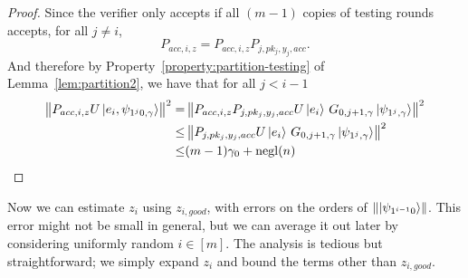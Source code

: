 \begin{proof}
	Since the verifier only accepts if all $(m-1)$ copies of testing rounds accepts, for all $j\neq i$,
	$$P_{acc,i,z}=P_{acc,i,z}P_{j,pk_j,y_j,acc}.$$
	And therefore by Property~\ref{property:partition-testing} of Lemma~\ref{lem:partition2}, we have that for all $j <i-1$
	\begin{align} \label{eq:rejected-d}
		\left\lVert P_{acc,i,z} U \ket{e_i, \psi_{1^j0,\gamma}}\right\rVert^2
		=& \left\lVert P_{acc,i,z}P_{j,pk_j,y_j,acc} U \ket{e_i}\, G_{0,j+1,\gamma}\ket{\psi_{1^j,\gamma}}  \right\rVert^2 \nonumber \\
		\leq& \left\lVert P_{j,pk_j,y_j,acc} U \ket{e_i}\, G_{0,j+1,\gamma}\ket{\psi_{1^j,\gamma}}  \right\rVert^2 \nonumber \\
		\leq& (m-1)\gamma_0+\operatorname{negl}(n)
	\end{align}
\end{proof}

Now we can estimate $z_i$ using $z_{i, good}$, with errors on the orders of $\left\lVert\ket{\psi_{1^{i-1}0}}\right\rVert$.
This error might not be small in general,
but we can average it out later by considering uniformly random $i\in[m]$.
The analysis is tedious but straightforward;
we simply expand $z_i$ and bound the terms other than $z_{i, good}$.

